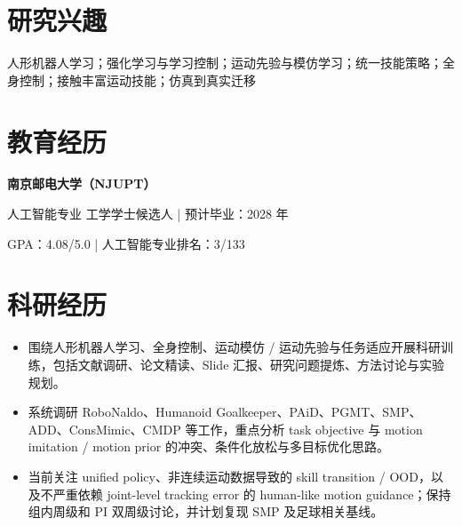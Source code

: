 \documentclass[10pt]{article}
\begin{document}
\linespread{1.03}\selectfont
{}

\section{研究兴趣}\color{black}
人形机器人学习；强化学习与学习控制；运动先验与模仿学习；统一技能策略；全身控制；接触丰富运动技能；仿真到真实迁移

\section{教育经历}\color{black}
{\sffamily\color{cvnavy}\bfseries 南京邮电大学（NJUPT）}\par
\vspace{1pt}人工智能专业 工学学士候选人 \quad | \quad 预计毕业：2028 年\par
\vspace{1pt}GPA：4.08/5.0 \quad | \quad 人工智能专业排名：3/133

\section{科研经历}\color{black}
\begin{itemize}
  \item 围绕人形机器人学习、全身控制、运动模仿 / 运动先验与任务适应开展科研训练，包括文献调研、论文精读、Slide 汇报、研究问题提炼、方法讨论与实验规划。
  \item 系统调研 RoboNaldo、Humanoid Goalkeeper、PAiD、PGMT、SMP、ADD、ConsMimic、CMDP 等工作，重点分析 task objective 与 motion imitation / motion prior 的冲突、条件化放松与多目标优化思路。
  \item 当前关注 unified policy、非连续运动数据导致的 skill transition / OOD，以及不严重依赖 joint-level tracking error 的 human-like motion guidance；保持组内周级和 PI 双周级讨论，并计划复现 SMP 及足球相关基线。
\end{itemize}
\end{document}
